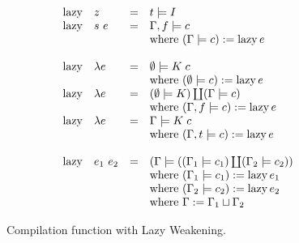 \documentclass[conference]{IEEEtran}
\DeclareMathOperator{\lazy}{lazy}
\begin{document}
\begin{figure}
    \begin{equation*}
        \begin{array}{l l l l}
            \lazy & z         & = & t \models I                                                             \\
            \lazy & s \ e     & = & \Gamma,f \models c                                                      \\
                  &           &   & \text{where } (\Gamma \models c) := \lazy e                             \\
            \\
            \lazy & \lambda e & = & \emptyset \models K \; c                                                \\
                  &           &   & \text{where } (\emptyset \models c) := \lazy e                          \\
            \lazy & \lambda e & = & (\emptyset \models K) \coprod (\Gamma \models c)                        \\
                  &           &   & \text{where } (\Gamma,f \models c) := \lazy e                           \\
            \lazy & \lambda e & = & \Gamma \models K \; c                                                   \\
                  &           &   & \text{where } (\Gamma,t \models c) := \lazy e                           \\
            \\
            \lazy & e_1 \ e_2 & = & (\Gamma \models ((\Gamma_1 \models c_1) \coprod (\Gamma_2 \models c_2)) \\
                  &           &   & \text{where } (\Gamma_1 \models c_1) := \lazy e_1                       \\
                  &           &   & \text{where } (\Gamma_2 \models c_2) := \lazy e_2                       \\
                  &           &   & \text{where } \Gamma := \Gamma_1 \sqcup \Gamma_2                        \\
        \end{array}
    \end{equation*}
    \centering
    \caption{Compilation function with Lazy Weakening.}
    \label{fig:lazy}
\end{figure}
\end{document}
